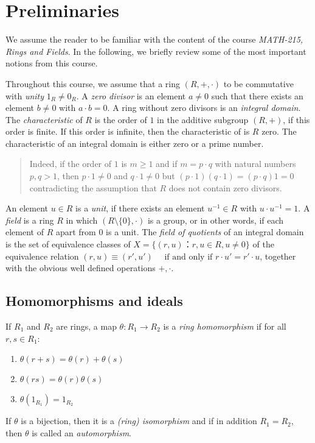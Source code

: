 \chapter{Preliminaries}
\label{cha:preliminaries}


We assume the reader to be familiar with the content of the course \emph{MATH-215, Rings and Fields}. In the following, we briefly review some of the most important notions from this course.

Throughout this course, we assume that a ring $(R,+,⋅)$ to be commutative with \emph{unity}  $1_R \neq 0_R$. A \emph{zero divisor} is an element $a≠0$ such that there exists  an element $b≠0$ with $a⋅b = 0$. A ring without zero divisors is an  \emph{integral domain}. The \emph{characteristic} of $R$ is the order of $1$ in the additive subgroup $(R,+)$, if this order is finite. If this order is infinite, then the characteristic of is $R$ zero. The characteristic of an integral domain is either zero or a prime number.
\begin{quote}
  \small Indeed, if the order of $1$ is $m ≥1$ and if $m = p⋅q$ with natural numbers $p,q >1$, then $ p ⋅1≠ 0$ and   $q ⋅1≠0$ but  $ (p ⋅1 ) (q ⋅1) = (p⋅q) 1 = 0$ contradicting the assumption that $R$ does not contain zero divisors. 
\end{quote}


An element $u ∈ R$ is a  \emph{unit}, if there exists an element $u^{-1} ∈R$ with $u ⋅ u^{-1} = 1$. 
A \emph{field} is a ring $R$ in which $(R \setminus \{0\}, ⋅)$  is a group, or in other words, if each element of $R$ apart from $0$ is a unit. The \emph{field of quotients} of an integral domain is the set of equivalence classes of $X = \{ (r,u) ： r,u ∈R, u ≠0\}$ of the equivalence relation
$  (r,u) ≡ (r',u') \quad \text{ if  and only if } r ⋅ u' = r' ⋅ u$,  together with the obvious well defined operations $+, ⋅$.




\section{Homomorphisms and ideals}
\label{sec:homomorphisms-ideals}


If $R_1$ and $R_2$ are rings, a map  $θ: R_1 → R_2$ is a \emph{ring  homomorphism} if for all $r,s ∈R_1$:
\begin{enumerate}
\item $θ(r+s) = θ(r) + θ(s)$
\item $θ(rs) = θ(r) θ(s)$
\item $θ(1_{R_1}) = 1_{R_2} $ 
\end{enumerate}
If $θ$ is a bijection, then it is a \emph{(ring) isomorphism} and if in addition $R_1 = R_2$, then $θ$ is called an \emph{automorphism}.

